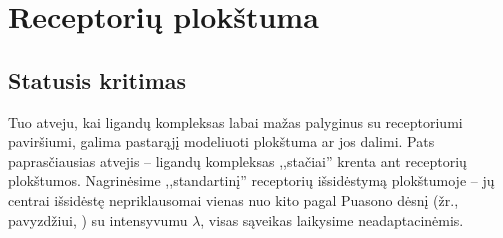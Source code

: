 \documentclass[10pt]{article}
\begin{document}
\section{Receptorių plokštuma}
\subsection{Statusis kritimas}
Tuo atveju, kai ligandų kompleksas labai mažas palyginus su 
receptoriumi paviršiumi, galima pastarąjį modeliuoti plokštuma ar jos dalimi. Pats paprasčiausias atvejis -- ligandų kompleksas ,,stačiai'' krenta ant receptorių plokštumos. Nagrinėsime ,,standartinį''  receptorių išsidėstymą plokštumoje -- jų centrai išsidėstę nepriklausomai vienas nuo kito pagal Puasono dėsnį (žr., pavyzdžiui, \cite{Lange03}) su intensyvumu $\lambda$, visas sąveikas laikysime neadaptacinėmis. 


\end{document}
